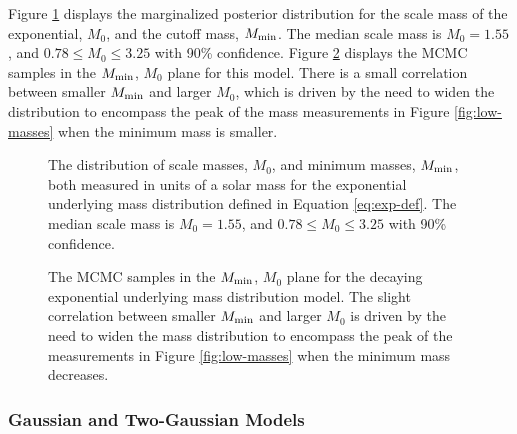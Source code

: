 \documentclass[preprint]{aastex}
\newcommand{\Mmin}{M_{\textnormal{min}}}
\begin{document}
Figure \ref{fig:exp-marginal} displays the marginalized posterior
distribution for the scale mass of the exponential, $M_0$, and the
cutoff mass, $\Mmin$.  The median scale mass is $M_0 = 1.55$, and
$0.78 \leq M_0 \leq 3.25$ with 90\% confidence.  Figure
\ref{fig:exp-2D} displays the MCMC samples in the $\Mmin$, $M_0$ plane
for this model.  There is a small correlation between smaller $\Mmin$
and larger $M_0$, which is driven by the need to widen the
distribution to encompass the peak of the mass measurements in Figure
\ref{fig:low-masses} when the minimum mass is smaller.

\begin{figure}
  \begin{center}
  \end{center}
  \caption{\label{fig:exp-marginal} The distribution of scale masses,
    $M_0$, and minimum masses, $\Mmin$, both measured in units of a
    solar mass for the exponential underlying mass distribution
    defined in Equation \eqref{eq:exp-def}.  The median scale mass is
    $M_0 = 1.55$, and $0.78 \leq M_0 \leq 3.25$ with 90\%
    confidence.}
\end{figure}

\begin{figure}
  \begin{center}
  \end{center}
  \caption{\label{fig:exp-2D} The MCMC samples in the $\Mmin$, $M_0$
    plane for the decaying exponential underlying mass distribution
    model.  The slight correlation between smaller $\Mmin$ and larger
    $M_0$ is driven by the need to widen the mass distribution to
    encompass the peak of the measurements in Figure
    \ref{fig:low-masses} when the minimum mass decreases.}
\end{figure}

\subsubsection{Gaussian and Two-Gaussian Models}
\label{sec:gaussian}
\end{document}
